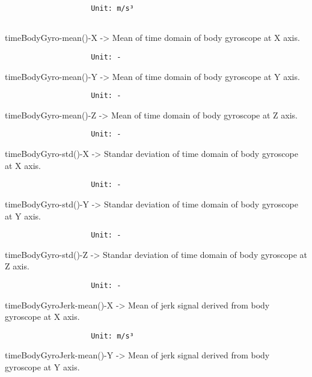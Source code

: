 \documentclass[
]{article}
\begin{document}
\begin{verbatim}
                    Unit: m/s³
                    
\end{verbatim}

timeBodyGyro-mean()-X -\textgreater{} Mean of time domain of body
gyroscope at X axis.

\begin{verbatim}
                    Unit: -
\end{verbatim}

timeBodyGyro-mean()-Y -\textgreater{} Mean of time domain of body
gyroscope at Y axis.

\begin{verbatim}
                    Unit: -
\end{verbatim}

timeBodyGyro-mean()-Z -\textgreater{} Mean of time domain of body
gyroscope at Z axis.

\begin{verbatim}
                    Unit: -
\end{verbatim}

timeBodyGyro-std()-X -\textgreater{} Standar deviation of time domain of
body gyroscope at X axis.

\begin{verbatim}
                    Unit: -
\end{verbatim}

timeBodyGyro-std()-Y -\textgreater{} Standar deviation of time domain of
body gyroscope at Y axis.

\begin{verbatim}
                    Unit: -
\end{verbatim}

timeBodyGyro-std()-Z -\textgreater{} Standar deviation of time domain of
body gyroscope at Z axis.

\begin{verbatim}
                    Unit: -
\end{verbatim}

timeBodyGyroJerk-mean()-X -\textgreater{} Mean of jerk signal derived
from body gyroscope at X axis.

\begin{verbatim}
                    Unit: m/s³
\end{verbatim}

timeBodyGyroJerk-mean()-Y -\textgreater{} Mean of jerk signal derived
from body gyroscope at Y axis.
\end{document}
